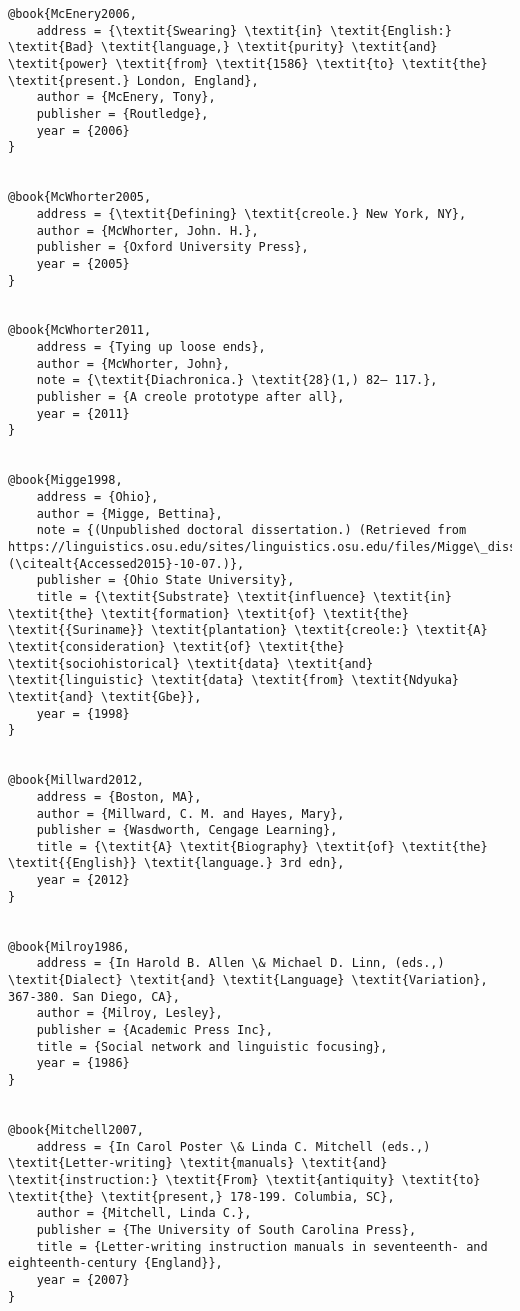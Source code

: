 \begin{verbatim}
@book{McEnery2006,
	address = {\textit{Swearing} \textit{in} \textit{English:} \textit{Bad} \textit{language,} \textit{purity} \textit{and} \textit{power} \textit{from} \textit{1586} \textit{to} \textit{the} \textit{present.} London, England},
	author = {McEnery, Tony},
	publisher = {Routledge},
	year = {2006}
}


@book{McWhorter2005,
	address = {\textit{Defining} \textit{creole.} New York, NY},
	author = {McWhorter, John. H.},
	publisher = {Oxford University Press},
	year = {2005}
}


@book{McWhorter2011,
	address = {Tying up loose ends},
	author = {McWhorter, John},
	note = {\textit{Diachronica.} \textit{28}(1,) 82– 117.},
	publisher = {A creole prototype after all},
	year = {2011}
}


@book{Migge1998,
	address = {Ohio},
	author = {Migge, Bettina},
	note = {(Unpublished doctoral dissertation.) (Retrieved from https://linguistics.osu.edu/sites/linguistics.osu.edu/files/Migge\_dissertation\_1998.pdf) (\citealt{Accessed2015}-10-07.)},
	publisher = {Ohio State University},
	title = {\textit{Substrate} \textit{influence} \textit{in} \textit{the} \textit{formation} \textit{of} \textit{the} \textit{{Suriname}} \textit{plantation} \textit{creole:} \textit{A} \textit{consideration} \textit{of} \textit{the} \textit{sociohistorical} \textit{data} \textit{and} \textit{linguistic} \textit{data} \textit{from} \textit{Ndyuka} \textit{and} \textit{Gbe}},
	year = {1998}
}


@book{Millward2012,
	address = {Boston, MA},
	author = {Millward, C. M. and Hayes, Mary},
	publisher = {Wasdworth, Cengage Learning},
	title = {\textit{A} \textit{Biography} \textit{of} \textit{the} \textit{{English}} \textit{language.} 3rd edn},
	year = {2012}
}


@book{Milroy1986,
	address = {In Harold B. Allen \& Michael D. Linn, (eds.,) \textit{Dialect} \textit{and} \textit{Language} \textit{Variation}, 367-380. San Diego, CA},
	author = {Milroy, Lesley},
	publisher = {Academic Press Inc},
	title = {Social network and linguistic focusing},
	year = {1986}
}


@book{Mitchell2007,
	address = {In Carol Poster \& Linda C. Mitchell (eds.,) \textit{Letter-writing} \textit{manuals} \textit{and} \textit{instruction:} \textit{From} \textit{antiquity} \textit{to} \textit{the} \textit{present,} 178-199. Columbia, SC},
	author = {Mitchell, Linda C.},
	publisher = {The University of South Carolina Press},
	title = {Letter-writing instruction manuals in seventeenth- and eighteenth-century {England}},
	year = {2007}
}



\end{verbatim}
